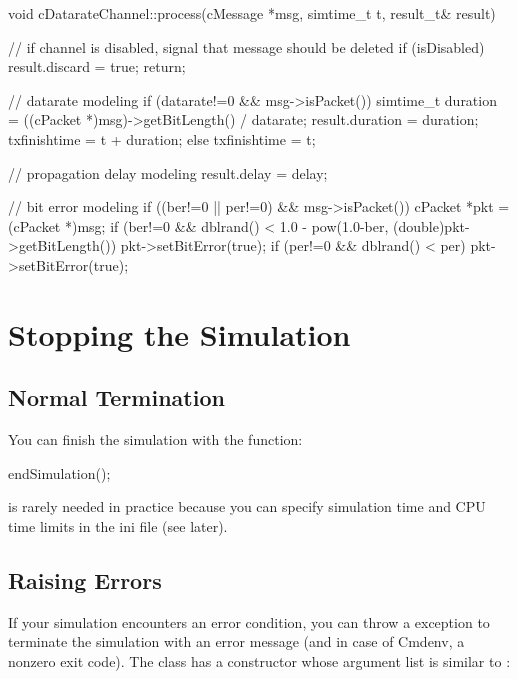\begin{cpp}
void cDatarateChannel::process(cMessage *msg, simtime_t t, result_t& result)
{
    // if channel is disabled, signal that message should be deleted
    if (isDisabled) {
        result.discard = true;
        return;
    }

    // datarate modeling
    if (datarate!=0 && msg->isPacket()) {
        simtime_t duration = ((cPacket *)msg)->getBitLength() / datarate;
        result.duration = duration;
        txfinishtime = t + duration;
    }
    else {
        txfinishtime = t;
    }

    // propagation delay modeling
    result.delay = delay;

    // bit error modeling
    if ((ber!=0 || per!=0) && msg->isPacket())
    {
        cPacket *pkt = (cPacket *)msg;
        if (ber!=0 && dblrand() < 1.0 - pow(1.0-ber, (double)pkt->getBitLength())
            pkt->setBitError(true);
        if (per!=0 && dblrand() < per)
            pkt->setBitError(true);
    }
}
\end{cpp}



\section{Stopping the Simulation}
\label{sec:simple-modules:stopping}

\subsection{Normal Termination}

You can finish the simulation with the  function:

\begin{cpp}
endSimulation();
\end{cpp}

 is rarely needed in practice because you
can specify simulation time and CPU time limits
in the ini file (see later).

\subsection{Raising Errors}

If your simulation encounters an error condition, you can throw a
 exception to terminate the simulation with
an error message (and in case of Cmdenv, a nonzero exit code).
The  class has a constructor whose argument list
is similar to :

